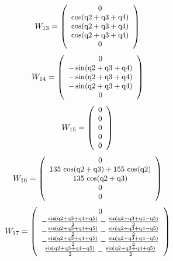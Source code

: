 \documentclass[fleqn, a4paper, 5pt, russian]{article}
\begin{document}
\begin{landscape}
\begin{equation}
{}\end{equation}
\begin{equation}
\small{
	W_{13}=
	\left(\begin{array}{c} 0\\ \cos\!\left(\mathrm{q2} + \mathrm{q3} + \mathrm{q4}\right)\\ \cos\!\left(\mathrm{q2} + \mathrm{q3} + \mathrm{q4}\right)\\ \cos\!\left(\mathrm{q2} + \mathrm{q3} + \mathrm{q4}\right)\\ 0 \end{array}\right)
}\end{equation}
\begin{equation}
\small{
	W_{14}=
	\left(\begin{array}{c} 0\\ - \sin\!\left(\mathrm{q2} + \mathrm{q3} + \mathrm{q4}\right)\\ - \sin\!\left(\mathrm{q2} + \mathrm{q3} + \mathrm{q4}\right)\\ - \sin\!\left(\mathrm{q2} + \mathrm{q3} + \mathrm{q4}\right)\\ 0 \end{array}\right)
}\end{equation}
\begin{equation}
\small{
	W_{15}=
	\left(\begin{array}{c} 0\\ 0\\ 0\\ 0\\ 0 \end{array}\right)
}\end{equation}
\begin{equation}
\small{
	W_{16}=
	\left(\begin{array}{c} 0\\ 135\, \cos\!\left(\mathrm{q2} + \mathrm{q3}\right) + 155\, \cos\!\left(\mathrm{q2}\right)\\ 135\, \cos\!\left(\mathrm{q2} + \mathrm{q3}\right)\\ 0\\ 0 \end{array}\right)
}\end{equation}
\begin{equation}
\small{
	W_{17}=
	\left(\begin{array}{c} 0\\  - \frac{\sin\!\left(\mathrm{q2} + \mathrm{q3} + \mathrm{q4} + \mathrm{q5}\right)}{2} - \frac{\sin\!\left(\mathrm{q2} + \mathrm{q3} + \mathrm{q4} - \mathrm{q5}\right)}{2}\\  - \frac{\sin\!\left(\mathrm{q2} + \mathrm{q3} + \mathrm{q4} + \mathrm{q5}\right)}{2} - \frac{\sin\!\left(\mathrm{q2} + \mathrm{q3} + \mathrm{q4} - \mathrm{q5}\right)}{2}\\  - \frac{\sin\!\left(\mathrm{q2} + \mathrm{q3} + \mathrm{q4} + \mathrm{q5}\right)}{2} - \frac{\sin\!\left(\mathrm{q2} + \mathrm{q3} + \mathrm{q4} - \mathrm{q5}\right)}{2}\\ \frac{\sin\!\left(\mathrm{q2} + \mathrm{q3} + \mathrm{q4} - \mathrm{q5}\right)}{2} - \frac{\sin\!\left(\mathrm{q2} + \mathrm{q3} + \mathrm{q4} + \mathrm{q5}\right)}{2} \end{array}\right)
}
\end{equation}
\end{landscape}
\end{document}
